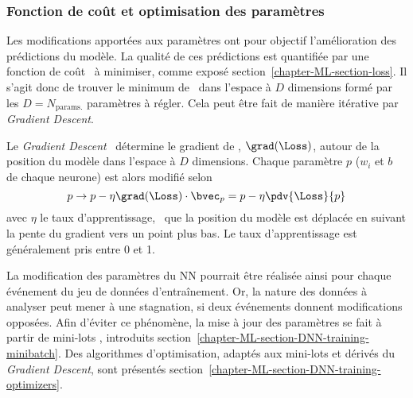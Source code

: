 \subsubsection{Fonction de coût et optimisation des paramètres}
Les modifications apportées aux paramètres ont pour objectif l'amélioration des prédictions du modèle.
La qualité de ces prédictions est quantifiée par une fonction de coût \Loss\ à minimiser, comme exposé section~\ref{chapter-ML-section-loss}.
Il s'agit donc de trouver le minimum de \Loss\ dans l'espace à $D$ dimensions formé par les $D=N_\text{params.}$ paramètres à régler.
Cela peut être fait de manière itérative par \emph{Gradient Descent}.
\par
Le \emph{Gradient Descent}~\cite{cauchy_1847} détermine le gradient de \Loss, $\grad(\Loss)$, autour de la \og position \fg{} du modèle dans l'espace à $D$ dimensions.
Chaque paramètre $p$ ($w_i$ et $b$ de chaque neurone) est alors modifié selon
\begin{equation}
p \to p - \eta \grad(\Loss) \cdot \bvec_p = p - \eta \pdv{\Loss}{p}
\end{equation}
avec $\eta$ le taux d'apprentissage,
\ie\ que la position du modèle est déplacée en suivant la pente du gradient vers un point plus bas.
Le taux d'apprentissage est généralement pris entre 0 et 1.
\par
La modification des paramètres du NN pourrait être réalisée ainsi pour chaque événement du jeu de données d'entraînement.
Or, la nature des données à analyser peut mener à une stagnation, si deux événements donnent modifications opposées.
Afin d'éviter ce phénomène, la mise à jour des paramètres se fait à partir de \og mini-lots \fg, introduits section~\ref{chapter-ML-section-DNN-training-minibatch}.
Des algorithmes d'optimisation, adaptés aux mini-lots et dérivés du \emph{Gradient Descent}, sont présentés section~\ref{chapter-ML-section-DNN-training-optimizers}.
